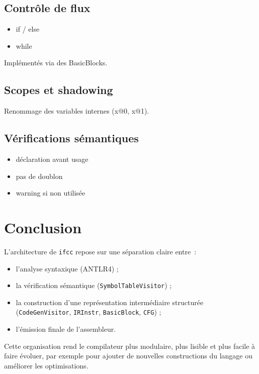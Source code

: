 \documentclass[11pt,a4paper]{article}
\begin{document}
\subsection{Contrôle de flux}

\begin{itemize}
  \item if / else
  \item while
\end{itemize}

Implémentés via des BasicBlocks.

\subsection{Scopes et shadowing}

Renommage des variables internes (x@0, x@1).

\subsection{Vérifications sémantiques}

\begin{itemize}
  \item déclaration avant usage
  \item pas de doublon
  \item warning si non utilisée
\end{itemize}

\section{Conclusion}

L'architecture de \texttt{ifcc} repose sur une séparation claire entre~:

\begin{itemize}
  \item l'analyse syntaxique (ANTLR4) ;
  \item la vérification sémantique (\texttt{SymbolTableVisitor}) ;
  \item la construction d'une représentation intermédiaire structurée (\texttt{CodeGenVisitor}, \texttt{IRInstr}, \texttt{BasicBlock}, \texttt{CFG}) ;
  \item l'émission finale de l'assembleur.
\end{itemize}

Cette organisation rend le compilateur plus modulaire, plus lisible et plus facile à faire évoluer, par exemple pour ajouter de nouvelles constructions du langage ou améliorer les optimisations.
\end{document}
